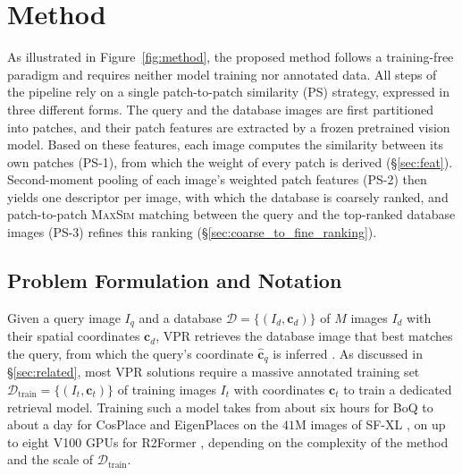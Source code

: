\section{Method}
\label{sec:method}
As illustrated in Figure~\ref{fig:method}, the proposed method \method{} follows a training-free paradigm and requires neither model training nor annotated data. All steps of the pipeline rely on a single patch-to-patch similarity (PS) strategy, expressed in three different forms. The query and the database images are first partitioned into patches, and their patch features are extracted by a frozen pretrained vision model. Based on these features, each image computes the similarity between its own patches (PS-1), from which the weight of every patch is derived (\S\ref{sec:feat}). Second-moment pooling of each image's weighted patch features (PS-2) then yields one descriptor per image, with which the database is coarsely ranked, and patch-to-patch \textsc{MaxSim} matching \citep{chamfer} between the query and the top-ranked database images (PS-3) refines this ranking (\S\ref{sec:coarse_to_fine_ranking}).
\subsection{Problem Formulation and Notation}  %
\label{sec:prelim}
Given a query image $I_q$ and a database $\mathcal{D}=\{(I_d,\mathbf c_d)\}$ of $M$ images $I_d$ with their spatial coordinates $\mathbf c_d$, VPR retrieves the database image that best matches the query, from which the query's coordinate $\hat{\mathbf c}_q$ is inferred \citep{netvlad}. As discussed in \S\ref{sec:related}, most VPR solutions require a massive annotated training set $\mathcal{D}_{\mathrm{train}}=\{(I_t,\mathbf c_t)\}$ of training images $I_t$ with coordinates $\mathbf c_t$ to train a dedicated retrieval model. Training such a model takes from about six hours for BoQ \citep{boq} to about a day for CosPlace and EigenPlaces on the $41$M images of SF-XL \citep{cosplace,eigenplaces}, on up to eight V100 GPUs for R2Former \citep{r2former}, depending on the complexity of the method and the scale of $\mathcal{D}_{\mathrm{train}}$.

